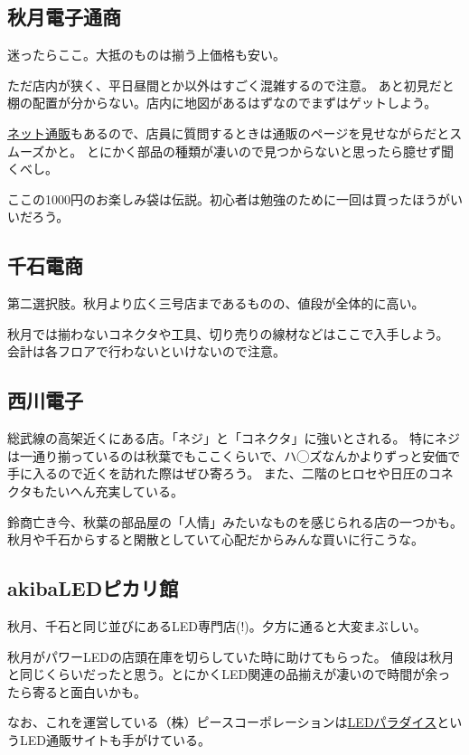\documentclass[letterpaper,10pt,dvipdfmx]{sphinxmanual}
\begin{document}
\subsection{秋月電子通商}
\label{\detokenize{begginers/buy_parts:id6}}
迷ったらここ。大抵のものは揃う上価格も安い。

ただ店内が狭く、平日昼間とか以外はすごく混雑するので注意。
あと初見だと棚の配置が分からない。店内に地図があるはずなのでまずはゲットしよう。

\href{http://akizukidenshi.com/}{ネット通販}もあるので、店員に質問するときは通販のページを見せながらだとスムーズかと。
とにかく部品の種類が凄いので見つからないと思ったら臆せず聞くべし。

ここの1000円のお楽しみ袋は伝説。初心者は勉強のために一回は買ったほうがいいだろう。


\subsection{千石電商}
\label{\detokenize{begginers/buy_parts:id7}}
第二選択肢。秋月より広く三号店まであるものの、値段が全体的に高い。

秋月では揃わないコネクタや工具、切り売りの線材などはここで入手しよう。
会計は各フロアで行わないといけないので注意。


\subsection{西川電子}
\label{\detokenize{begginers/buy_parts:id8}}
総武線の高架近くにある店。「ネジ」と「コネクタ」に強いとされる。
特にネジは一通り揃っているのは秋葉でもここくらいで、ハ◯ズなんかよりずっと安価で手に入るので近くを訪れた際はぜひ寄ろう。
また、二階のヒロセや日圧のコネクタもたいへん充実している。

鈴商亡き今、秋葉の部品屋の「人情」みたいなものを感じられる店の一つかも。
秋月や千石からすると閑散としていて心配だからみんな買いに行こうな。


\subsection{akibaLEDピカリ館}
\label{\detokenize{begginers/buy_parts:akibaled}}
秋月、千石と同じ並びにあるLED専門店(!)。夕方に通ると大変まぶしい。

秋月がパワーLEDの店頭在庫を切らしていた時に助けてもらった。
値段は秋月と同じくらいだったと思う。とにかくLED関連の品揃えが凄いので時間が余ったら寄ると面白いかも。

なお、これを運営している（株）ピースコーポレーションは\href{http://www.led-paradise.com/}{LEDパラダイス}というLED通販サイトも手がけている。
\end{document}
